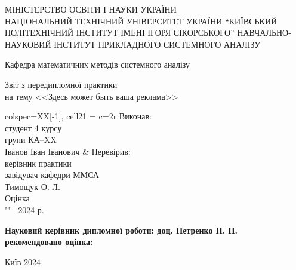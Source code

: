 \documentclass[../diploma]{subfiles}
\begin{document}
\begin{titlepage}
\centering

МІНІСТЕРСТВО ОСВІТИ І НАУКИ УКРАЇНИ\\
НАЦІОНАЛЬНИЙ ТЕХНІЧНИЙ УНІВЕРСИТЕТ УКРАЇНИ
``КИЇВСЬКИЙ ПОЛІТЕХНІЧНИЙ ІНСТИТУТ ІМЕНІ ІГОРЯ СІКОРСЬКОГО''
НАВЧАЛЬНО-НАУКОВИЙ ІНСТИТУТ ПРИКЛАДНОГО СИСТЕМНОГО АНАЛІЗУ

Кафедра математичних методів системного аналізу

\vfill

Звіт з передипломної практики\\
на тему <<Здесь может быть ваша реклама>>

\vfill

\begin{tblr}{
	colspec={XX[-1]},
	cell{2}{1} = {c=2}{r}
}
	{
		Виконав:\\
		студент 4 курсу\\
		групи КА--XX\\
		Іванов Іван Іванович
	}
	&
	{
		Перевірив:\\
		керівник практики\\
		завідувач кафедри ММСА\\
		Тимощук О. Л. 
	}
	\\
	{
		Оцінка \\
		""\  2024 р.
	}
\end{tblr}

\vfill

\begin{flushleft}\bf
Науковий керівник дипломної роботи: доц. Петренко П. П.\\
рекомендовано оцінка: \normalfont{}
\end{flushleft}

\vfill

Київ 2024
\end{titlepage}
\end{document}

